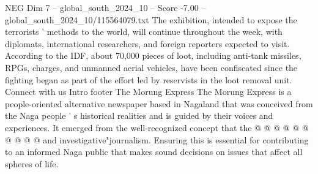 \begin{textsample}{NEG Dim 7 – global\_south\_2024\_10 – Score -7.00 – global\_south\_2024\_10/115564079.txt}
The exhibition, intended to expose the terrorists ' methods to the world, will continue throughout the week, with diplomats, international researchers, and foreign reporters expected to visit.
According to the IDF, about 70,000 pieces of loot, including anti-tank missiles, RPGs, charges, and unmanned aerial vehicles, have been confiscated since the fighting began as part of the effort led by reservists in the loot removal unit.
Connect with us Intro footer The Morung Express The Morung Express is a people-oriented alternative newspaper based in Nagaland that was conceived from the Naga people ' s historical realities and is guided by their voices and experiences.
It emerged from the well-recognized concept that the @ @ @ @ @ @ @ @ @ @ and investigative"journalism.
Ensuring this is essential for contributing to an informed Naga public that makes sound decisions on issues that affect all spheres of life.

\end{textsample}
